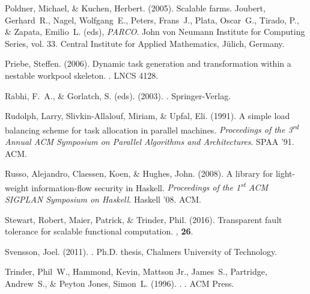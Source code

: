 \documentclass{jfp1}
\DeclareRobustCommand{\st}{\textsuperscript{st}\xspace}
\DeclareRobustCommand{\xrd}{\textsuperscript{rd}\xspace}
\DeclareRobustCommand{\st}{\textsuperscript{st}\xspace}
\DeclareRobustCommand{\xrd}{\textsuperscript{rd}\xspace}
\begin{document}
\begin{thebibliography}{}
Poldner, Michael, \& Kuchen, Herbert. (2005).
\newblock Scalable farms.
 Joubert, Gerhard~R., Nagel, Wolfgang~E.,
  Peters, Frans~J., Plata, Oscar~G., Tirado, P., \& Zapata, Emilio~L. (eds),
  {\em PARCO}.
\newblock John von Neumann Institute for Computing Series, vol. 33.
\newblock Central Institute for Applied Mathematics, J{\"u}lich, Germany.

Priebe, Steffen. (2006).
\newblock Dynamic task generation and transformation within a nestable workpool
  skeleton.
.
\newblock LNCS 4128.

Rabhi, F.~A., \& Gorlatch, S. (eds). (2003).
.
\newblock Springer-Verlag.

Rudolph, Larry, Slivkin-Allalouf, Miriam, \& Upfal, Eli. (1991).
\newblock A simple load balancing scheme for task allocation in parallel
  machines.
 {\em Proceedings of the 3\xrd Annual ACM
  Symposium on Parallel Algorithms and Architectures}.
\newblock SPAA '91.
\newblock ACM.

Russo, Alejandro, Claessen, Koen, \& Hughes, John. (2008).
\newblock A library for light-weight information-flow security in {Haskell}.
 {\em Proceedings of the 1\st ACM SIGPLAN
  Symposium on Haskell}.
\newblock Haskell '08.
\newblock ACM.

Stewart, Robert, Maier, Patrick, \& Trinder, Phil. (2016).
\newblock Transparent fault tolerance for scalable functional computation.
, {\bf 26}.

Svensson, Joel. (2011).
.
\newblock Ph.D. thesis, Chalmers University of Technology.

Trinder, Phil~W., Hammond, Kevin, {Mattson Jr.}, James~S., Partridge,
  Andrew~S., \& {Peyton Jones}, Simon~L. (1996).
.
.
\newblock ACM Press.


\end{thebibliography}
\end{document}
